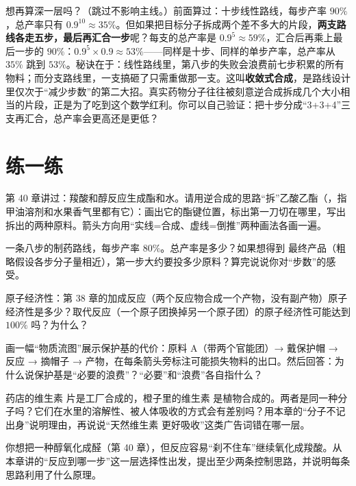 \begin{tiaozhan}
想再算深一层吗？（跳过不影响主线。）前面算过：十步线性路线，每步产率 $90\%$，总产率只有 $0.9^{10}\approx 35\%$。但如果把目标分子拆成两个差不多大的片段，\textbf{两支路线各走五步，最后再汇合一步}呢？每支的总产率是 $0.9^5\approx 59\%$，汇合后再乘上最后一步的 $90\%$：$0.9^5\times 0.9\approx 53\%$——同样是十步、同样的单步产率，总产率从 $35\%$ 跳到 $53\%$。秘诀在于：线性路线里，第八步的失败会浪费前七步积累的所有物料；而分支路线里，一支搞砸了只需重做那一支。这叫\textbf{收敛式合成}，是路线设计里仅次于“减少步数”的第二大招。真实药物分子往往被刻意逆合成拆成几个大小相当的片段，正是为了吃到这个数学红利。你可以自己验证：把十步分成“3+3+4”三支再汇合，总产率会更高还是更低？
\end{tiaozhan}

\section*{练一练}

\begin{sikaoti}
\item 第 40 章讲过：羧酸和醇反应生成酯和水。请用逆合成的思路“拆”乙酸乙酯（，指甲油溶剂和水果香气里都有它）：画出它的酯键位置，标出第一刀切在哪里，写出拆出的两种原料。箭头方向用“实线=合成、虚线=倒推”两种画法各画一遍。
\item 一条八步的制药路线，每步产率 $80\%$。总产率是多少？如果想得到  最终产品（粗略假设各步分子量相近），第一步大约要投多少原料？算完说说你对“步数”的感受。
\item 原子经济性：第 38 章的加成反应（两个反应物合成一个产物，没有副产物）原子经济性是多少？取代反应（一个原子团换掉另一个原子团）的原子经济性可能达到 $100\%$ 吗？为什么？
\item 画一幅“物质流图”展示保护基的代价：原料 A（带两个官能团）→ 戴保护帽 → 反应 → 摘帽子 → 产物，在每条箭头旁标注可能损失物料的出口。然后回答：为什么说保护基是“必要的浪费”？“必要”和“浪费”各自指什么？
\item 药店的维生素  片是工厂合成的，橙子里的维生素  是植物合成的。两者是同一种分子吗？它们在水里的溶解性、被人体吸收的方式会有差别吗？用本章的“分子不记出身”说明理由，再说说“天然维生素  更好吸收”这类广告词错在哪一层。
\item 你想把一种醇氧化成醛（第 40 章），但反应容易“刹不住车”继续氧化成羧酸。从本章讲的“反应到哪一步”这一层选择性出发，提出至少两条控制思路，并说明每条思路利用了什么原理。
\end{sikaoti}
